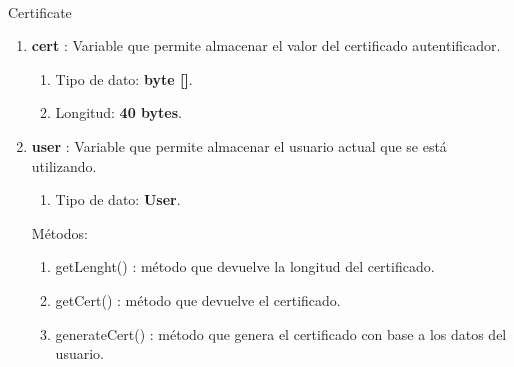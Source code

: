 \documentclass[12pt, a4paper, titlepage]{report}
\begin{document}
		        \paragraph{}
	            Certificate
			    \begin{enumerate}
    		        \item \textbf{cert} : Variable que permite almacenar el valor del certificado autentificador.
    		        \begin{enumerate}
    		            \item Tipo de dato: \textbf{byte []}.
    		            \item Longitud: \textbf{40 bytes}.
    		        \end{enumerate}
    		        \item \textbf{user} : Variable que permite almacenar el usuario actual que se está utilizando.
    		        \begin{enumerate}
    		            \item Tipo de dato: \textbf{User}.
    		        \end{enumerate}
    		        
    		        Métodos:
    		        \begin{enumerate}
    		            \item getLenght() : método que devuelve la longitud del certificado.
    		            \item getCert() : método que devuelve el certificado.
    		            \item generateCert() : método que genera el certificado con base a los datos del usuario.
    		        \end{enumerate}
			    \end{enumerate}
			    
\end{document}
